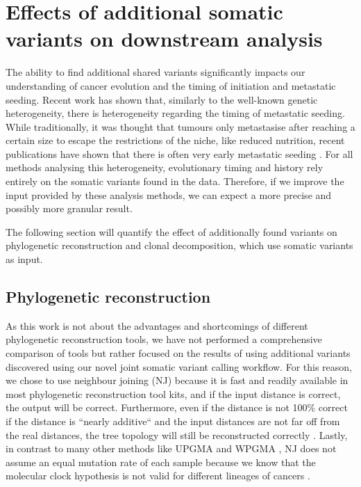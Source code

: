 \section[Effects on downstream analysis]{Effects of additional somatic variants on downstream analysis}
\label{variantcalling-sec:downstream}

The ability to find additional shared variants significantly impacts our understanding of cancer evolution and the timing of initiation and metastatic seeding. Recent work has shown that, similarly to the well-known genetic heterogeneity, there is heterogeneity regarding the timing of metastatic seeding. While traditionally, it was thought that tumours only metastasise after reaching a certain size to escape the restrictions of the niche, like reduced nutrition, recent publications have shown that there is often very early metastatic seeding \cite{Hu2019}. 
For all methods analysing this heterogeneity, evolutionary timing and history rely entirely on the somatic variants found in the data. Therefore, if we improve the input provided by these analysis methods, we can expect a more precise and possibly more granular result.

The following section will quantify the effect of additionally found variants on phylogenetic reconstruction and clonal decomposition, which use somatic variants as input.

\subsection[Phylogenetic reconstruction]{Phylogenetic reconstruction}
\label{variantcalling-sec:phylo}
As this work is not about the advantages and shortcomings of different phylogenetic reconstruction tools, we have not performed a comprehensive comparison of tools but rather focused on the results of using additional variants discovered using our novel joint somatic variant calling workflow. For this reason, we chose to use neighbour joining (NJ) \cite{Saitou1987} because it is fast and readily available in most phylogenetic reconstruction tool kits, and if the input distance is correct, the output will be correct. Furthermore, even if the distance is not 100\% correct if the distance is ``nearly additive`` and the input distances are not far off from the real distances, the tree topology will still be reconstructed correctly \cite{Mihaescu2007}. Lastly, in contrast to many other methods like UPGMA and WPGMA \cite{Sokal1958}, NJ does not assume an equal mutation rate of each sample because we know that the molecular clock hypothesis \cite{Zuckerkandl1962} is not valid for different lineages of cancers \cite{Shibata2010}.

